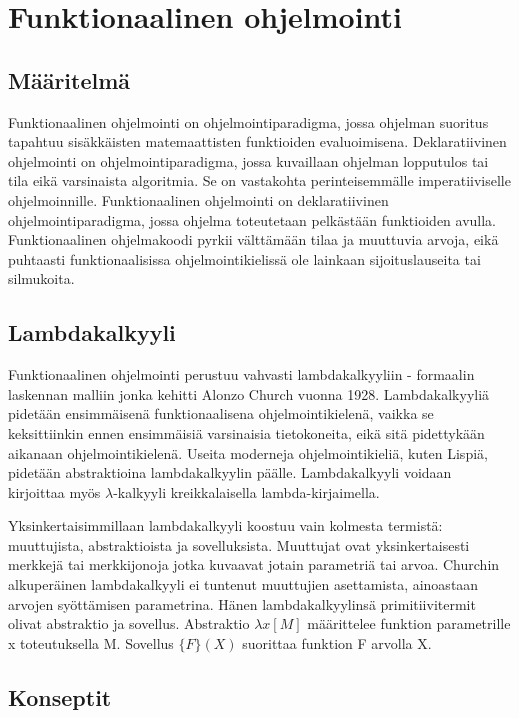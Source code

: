 \chapter{Funktionaalinen ohjelmointi} \label{Funktionaalinen ohjelmointi}

\section{Määritelmä}
Funktionaalinen ohjelmointi on ohjelmointiparadigma, jossa ohjelman suoritus tapahtuu sisäkkäisten matemaattisten
funktioiden evaluoimisena. Deklaratiivinen ohjelmointi on ohjelmointiparadigma, jossa kuvaillaan ohjelman lopputulos
tai tila eikä varsinaista algoritmia. Se on vastakohta perinteisemmälle imperatiiviselle ohjelmoinnille. Funktionaalinen
ohjelmointi on deklaratiivinen ohjelmointiparadigma, jossa ohjelma toteutetaan pelkästään funktioiden avulla.
Funktionaalinen ohjelmakoodi pyrkii välttämään tilaa ja muuttuvia arvoja, eikä puhtaasti funktionaalisissa
ohjelmointikielissä ole lainkaan sijoituslauseita tai silmukoita.\cite{hudak}

\section{Lambdakalkyyli}
Funktionaalinen ohjelmointi perustuu vahvasti lambdakalkyyliin - formaalin laskennan malliin jonka kehitti Alonzo Church
vuonna 1928. Lambdakalkyyliä pidetään ensimmäisenä funktionaalisena ohjelmointikielenä, vaikka se keksittiinkin ennen
ensimmäisiä varsinaisia tietokoneita, eikä sitä pidettykään aikanaan ohjelmointikielenä. Useita moderneja
ohjelmointikieliä, kuten Lispiä, pidetään abstraktioina lambdakalkyylin päälle. Lambdakalkyyli voidaan kirjoittaa myös
$ \lambda $-kalkyyli kreikkalaisella lambda-kirjaimella.\cite{hudak}

Yksinkertaisimmillaan lambdakalkyyli koostuu vain kolmesta termistä: muuttujista, abstraktioista ja sovelluksista.
Muuttujat ovat yksinkertaisesti merkkejä tai merkkijonoja jotka kuvaavat jotain parametriä tai arvoa. Churchin
alkuperäinen lambdakalkyyli ei tuntenut muuttujien asettamista, ainoastaan arvojen syöttämisen parametrina. Hänen
lambdakalkyylinsä primitiivitermit olivat abstraktio ja sovellus. Abstraktio $ \lambda x [ M ] $ määrittelee funktion
parametrille x toteutuksella M. Sovellus $ \{ F \} ( X ) $ suorittaa funktion F arvolla X.\cite{lambdacalculus}


\section{Konseptit}

